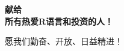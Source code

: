 \thispagestyle{empty}

\begin{center}  %
     \Large\bfseries 献给\\[2cm]  %
    所有热爱R语言和投资的人！ %
    \par  %
    愿我们勤奋、开放、日益精进！ %
\end{center}

\setlength{\abovedisplayskip}{-5pt}
\setlength{\abovedisplayshortskip}{-5pt}
